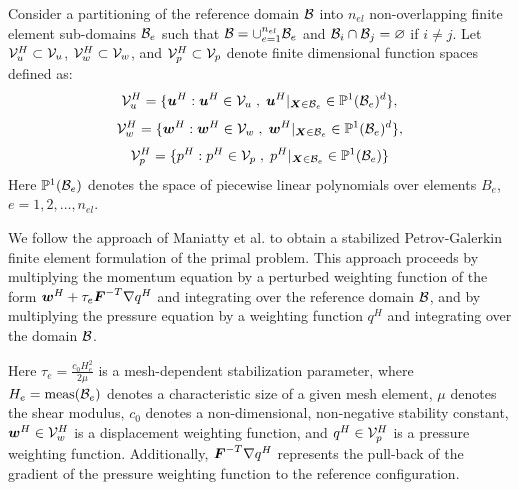 Consider a partitioning of the reference domain $\mathcal{B}$ into $n_{el}$
non-overlapping finite element sub-domains $\mathcal{B}_e$ such that $\mathcal{B} =
\cup_{e=1}^{n_{el}} \mathcal{B}_e$ and $\mathcal{B}_i \cap \mathcal{B}_j = \varnothing$ if $i \neq j$.
Let $\mathcal{V}^H_u \subset \mathcal{V}_u$, $\mathcal{V}^H_w \subset \mathcal{V}_w$, and $\mathcal{V}^H_p \subset \mathcal{V}_p$
denote finite dimensional function spaces defined as:
%
\begin{gather}
\mathcal{V}^H_u = \{ \boldsymbol{u}^H : \boldsymbol{u}^H \in \mathcal{V}_u \; , \;
\boldsymbol{u}^H |_{\boldsymbol{X} \in \mathcal{B}_e} \in \mathbb{P}^1 (\mathcal{B}_e)^d \},
\label{eq:mech_disp_space}
\end{gather}
%
\begin{gather}
\mathcal{V}^H_w = \{ \boldsymbol{w}^H : \boldsymbol{w}^H \in \mathcal{V}_w \; , \;
\boldsymbol{w}^H |_{\boldsymbol{X} \in \mathcal{B}_e} \in \mathbb{P}^1 (\mathcal{B}_e)^d \},
\label{eq:mech_weight_space}
\end{gather}
%
\begin{gather}
\mathcal{V}^H_p = \{ p^H : p^H \in \mathcal{V}_p \; , \;
p^H |_{\boldsymbol{X} \in \mathcal{B}_e} \in \mathbb{P}^1 (\mathcal{B}_e) \}
\label{eq:mech_press_space}
\end{gather}
%
Here $\mathbb{P}^1(\mathcal{B}_e)$ denotes the space of piecewise linear polynomials
over elements $B_e$, $e=1,2,\dots,n_{el}$.

We follow the approach of Maniatty et al. \cite{klaas1999stabilized,
maniatty2002higher, ramesh2005stabilized} to obtain a stabilized
Petrov-Galerkin finite element formulation of the primal problem.
This approach proceeds by multiplying the momentum equation by a perturbed
weighting function of the form $\boldsymbol{w}^H + \tau_e \boldsymbol{F}^{-T} \nabla q^H$
and integrating over the reference domain $\mathcal{B}$, and by multiplying the
pressure equation by a weighting function $q^H$ and integrating over the
domain $\mathcal{B}$.

Here $\tau_e = \frac{c_0 H_e^2}{2 \mu}$ is a mesh-dependent stabilization
parameter, where $H_e = \text{meas}(\mathcal{B}_e)$ denotes a characteristic size
of a given mesh element, $\mu$ denotes the shear modulus, $c_0$ denotes a
non-dimensional, non-negative stability constant, $\boldsymbol{w}^H \in \mathcal{V}^H_w$ is
a displacement weighting function, and $q^H \in \mathcal{V}^H_p$ is a
pressure weighting function. Additionally, $\boldsymbol{F}^{-T} \nabla q^H$
represents the pull-back of the gradient of the pressure weighting function
to the reference configuration.

